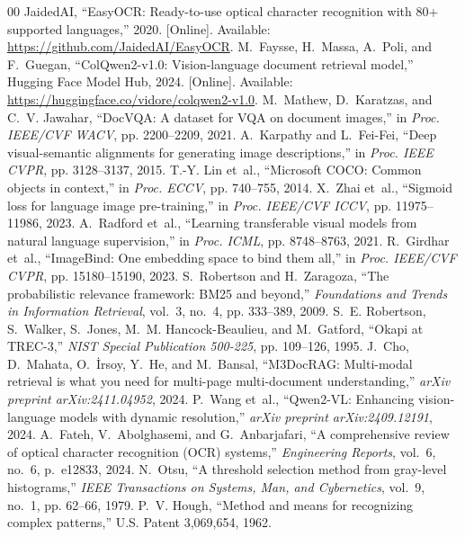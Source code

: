\begin{thebibliography}{00}
JaidedAI, ``EasyOCR: Ready-to-use optical character recognition with 80+ supported languages,'' 2020. [Online]. Available: \url{https://github.com/JaidedAI/EasyOCR}.
M.~Faysse, H.~Massa, A.~Poli, and F.~Guegan, ``ColQwen2-v1.0: Vision-language document retrieval model,'' Hugging Face Model Hub, 2024. [Online]. Available: \url{https://huggingface.co/vidore/colqwen2-v1.0}.
M.~Mathew, D.~Karatzas, and C.~V. Jawahar, ``DocVQA: A dataset for VQA on document images,'' in \emph{Proc. IEEE/CVF WACV}, pp. 2200--2209, 2021.
A.~Karpathy and L.~Fei-Fei, ``Deep visual-semantic alignments for generating image descriptions,'' in \emph{Proc. IEEE CVPR}, pp. 3128--3137, 2015.
T.-Y. Lin et~al., ``Microsoft COCO: Common objects in context,'' in \emph{Proc. ECCV}, pp. 740--755, 2014.
X.~Zhai et~al., ``Sigmoid loss for language image pre-training,'' in \emph{Proc. IEEE/CVF ICCV}, pp. 11975--11986, 2023.
A.~Radford et~al., ``Learning transferable visual models from natural language supervision,'' in \emph{Proc. ICML}, pp. 8748--8763, 2021.
R.~Girdhar et~al., ``ImageBind: One embedding space to bind them all,'' in \emph{Proc. IEEE/CVF CVPR}, pp. 15180--15190, 2023.
S.~Robertson and H.~Zaragoza, ``The probabilistic relevance framework: BM25 and beyond,'' \emph{Foundations and Trends in Information Retrieval}, vol.~3, no.~4, pp. 333--389, 2009.
S.~E. Robertson, S.~Walker, S.~Jones, M.~M. Hancock-Beaulieu, and M.~Gatford, ``Okapi at TREC-3,'' \emph{NIST Special Publication 500-225}, pp. 109--126, 1995.
J.~Cho, D.~Mahata, O.~{\.I}rsoy, Y.~He, and M.~Bansal, ``M3DocRAG: Multi-modal retrieval is what you need for multi-page multi-document understanding,'' \emph{arXiv preprint arXiv:2411.04952}, 2024.
P.~Wang et~al., ``Qwen2-VL: Enhancing vision-language models with dynamic resolution,'' \emph{arXiv preprint arXiv:2409.12191}, 2024.
A.~Fateh, V.~Abolghasemi, and G.~Anbarjafari, ``A comprehensive review of optical character recognition (OCR) systems,'' \emph{Engineering Reports}, vol.~6, no.~6, p.~e12833, 2024.
N.~Otsu, ``A threshold selection method from gray-level histograms,'' \emph{IEEE Transactions on Systems, Man, and Cybernetics}, vol.~9, no.~1, pp. 62--66, 1979.
P.~V. Hough, ``Method and means for recognizing complex patterns,'' U.S. Patent 3,069,654, 1962.

\end{thebibliography}
